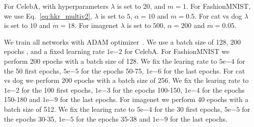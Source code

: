 For CelebA, with hyperparameters $\lambda$ is set to 20, and $m=1$. For FashionMNIST, we use  Eq.~\ref{eq:hkr_multiv2},   $\lambda$ is set to $5$,  $\alpha=10$ and $m=0.5$. For cat vs dog $\lambda$ is set to $10$ and $m=18$. For imagenet $\lambda$ is set to $500$,  $\alpha=200$ and $m=0.05$.


We train all networks with ADAM optimizer~\cite{Diederik14Adam}. We use a batch size of 128, 200 epochs , and a fixed learning rate $1\mathrm{e}{-2}$ for CelebA. For FashionMNIST we perform 200 epochs with a batch size of 128. We fix the learing rate to $5\mathrm{e}{-4}$ for the 50 first epochs, $5\mathrm{e}{-5}$ for the epochs 50-75, $1\mathrm{e}{-6}$ for the last epochs. For cat vs dog we perform 200 epochs with a batch size of 256. We fix the learing rate to $1\mathrm{e}{-2}$ for the 100 first epochs, $1\mathrm{e}{-3}$ for the epochs 100-150, $1\mathrm{e}{-4}$ for the epochs 150-180 and $1\mathrm{e}{-9}$ for the last epochs. For imagenet we perform 40 epochs with a batch size of 512. We fix the learing rate to $5\mathrm{e}{-4}$ for the 30 first epochs, $5\mathrm{e}{-5}$ for the epochs 30-35, $1\mathrm{e}{-5}$ for the epochs 35-38 and $1\mathrm{e}{-9}$ for the last epochs.
